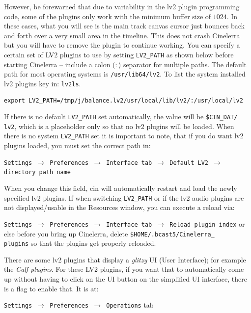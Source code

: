 However, be forewarned that due to variability in the lv2 plugin programming code, some of the plugins only work with the minimum buffer size of $1024$. In these cases, what you will see is the main track canvas cursor just bounces back and forth over a very small area in the timeline. This does not crash Cinelerra but you will have to remove the plugin to continue working.
You can specify a certain set of LV2 plugins to use by setting \texttt{LV2\_PATH} as shown below before starting Cinelerra -- include a colon ($:$) separator for multiple paths. The default path for most operating systems is \texttt{/usr/lib64/lv2}. To list the system installed lv2 plugins key in: \texttt{lv2ls}.

\begin{lstlisting}[numbers=none]
export LV2_PATH=/tmp/j/balance.lv2/usr/local/lib/lv2/:/usr/local/lv2
\end{lstlisting}

If there is no default \texttt{LV2\_PATH} set automatically, the value will be \texttt{\$CIN\_DAT/\\lv2}, which is a placeholder only so that no lv2 plugins will be loaded. When there is no system \texttt{LV2\_PATH} set it is important to note, that if you do want lv2 plugins loaded, you must set the correct path in:

\texttt{Settings $\rightarrow$ Preferences $\rightarrow$ Interface tab $\rightarrow$ Default LV2 $\rightarrow$ direc\-tory 
    path name}

When you change this field, cin will automatically restart and load the newly specified lv2 plugins. If when switching \texttt{LV2\_PATH} or if the lv2 audio plugins are not displayed/usable in the Resources window, you can execute a reload via:

\texttt{Settings $\rightarrow$  Preferences $\rightarrow$ Interface tab $\rightarrow$ Reload plugin in\-dex} 
or else before you bring up Cinelerra, delete \texttt{\$HOME/.bcast5/Cinelerra\_\\plugins} so that the plugins get properly reloaded.

There are some lv2 plugins that display a \textit{glitzy} UI (User Interface); for example the \textit{Calf plugins}. For these LV2 plugins, if you want that to automatically come up without having to click on the UI button on the simplified UI interface, there is a flag to enable that. It is at:

\texttt{Settings $\rightarrow$ Preferences $\rightarrow$ Operations} tab


